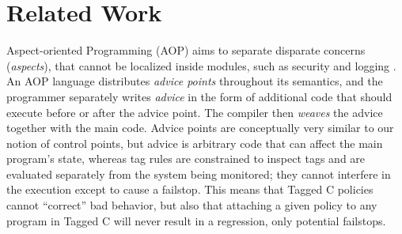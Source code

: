 \documentclass{llncs}
\begin{document}




\section{Related Work}
\label{sec:related}

Aspect-oriented Programming (AOP) aims to separate disparate concerns ({\em aspects}),
that cannot be localized inside modules, such as security and logging \cite{Kiczales97:AOP}. %
An AOP language distributes {\em advice points} throughout its semantics,
and the programmer separately writes {\em advice} in the form of
additional code that should execute before or after the advice point. The compiler
then {\em weaves} the advice together with the main code. 
Advice points are conceptually very similar to our notion of control points, 
but advice is arbitrary code that can affect the main program's state,
whereas tag rules are constrained to inspect tags and are evaluated separately
from the system being monitored; they cannot interfere in the execution except to cause a failstop.
This means that
Tagged C policies cannot ``correct'' bad behavior, but also
that attaching a given policy to any program in Tagged C will never result
in a regression, only potential failstops.
\end{document}
